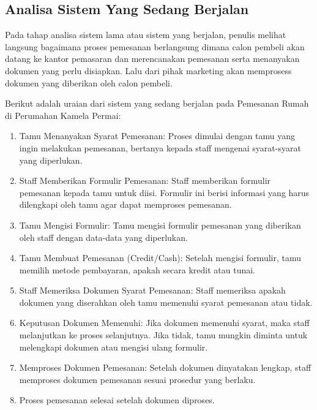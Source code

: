 \subsection{Analisa Sistem Yang Sedang Berjalan}
Pada tahap analisa sistem lama atau sistem yang berjalan, penulis melihat langsung bagaimana proses pemesanan berlangsung dimana calon pembeli akan datang ke kantor pemasaran dan merencanakan pemesanan serta menanyakan dokumen yang perlu disiapkan. Lalu dari pihak marketing akan memprosess dokumen yang diberikan oleh calon pembeli.
\par Berikut adalah uraian dari sistem yang sedang berjalan pada  Pemesanan Rumah di Perumahan Kamela Permai: 
\begin{enumerate}
    \item Tamu Menanyakan Syarat Pemesanan: Proses dimulai dengan tamu yang ingin melakukan pemesanan, bertanya kepada staff mengenai syarat-syarat yang diperlukan.
    \item Staff Memberikan Formulir Pemesanan: Staff memberikan formulir pemesanan kepada tamu untuk diisi. Formulir ini berisi informasi yang harus dilengkapi oleh tamu agar dapat memproses pemesanan.
    \item Tamu Mengisi Formulir: Tamu mengisi formulir pemesanan yang diberikan oleh staff dengan data-data yang diperlukan.
    \item Tamu Membuat Pemesanan (Credit/Cash): Setelah mengisi formulir, tamu memilih metode pembayaran, apakah secara kredit atau tunai.
    \item Staff Memeriksa Dokumen Syarat Pemesanan: Staff memeriksa apakah dokumen yang diserahkan oleh tamu memenuhi syarat pemesanan atau tidak.
    \item Keputusan Dokumen Memenuhi: Jika dokumen memenuhi syarat, maka staff melanjutkan ke proses selanjutnya. Jika tidak, tamu mungkin diminta untuk melengkapi dokumen atau mengisi ulang formulir.
    \item Memproses Dokumen Pemesanan: Setelah dokumen dinyatakan lengkap, staff memproses dokumen pemesanan sesuai prosedur yang berlaku.
    \item Proses pemesanan selesai setelah dokumen diproses.
\end{enumerate}

